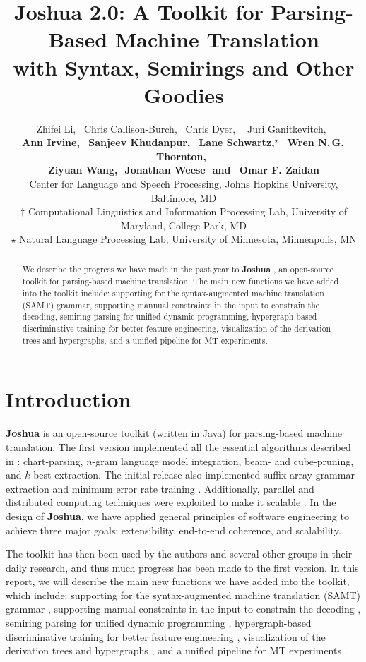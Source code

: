 \documentclass[11pt]{article}
\title{Joshua 2.0: A Toolkit for Parsing-Based Machine Translation \\with Syntax, Semirings and Other Goodies }
\author{
Zhifei Li,\,\,\,
Chris Callison-Burch,\,\,\,
Chris Dyer,$^\dagger$\,\,\,
Juri Ganitkevitch,\,\,\,
\\ {\bf
Ann Irvine,\,\,\,  
Sanjeev Khudanpur,\,\,\,
Lane Schwartz,$^\star$\,\,\, 
Wren N.\,G.\,Thornton,\,\,\,}
\\ {\bf
Ziyuan Wang,\,\,
Jonathan Weese\,\,
{\textnormal{and}}
\,\,\,Omar F. Zaidan
}\\
Center for Language and Speech Processing, Johns Hopkins University, Baltimore, MD\\
$\dagger$ Computational Linguistics and Information Processing Lab, University of Maryland, College Park, MD\\
$\star$ Natural Language Processing Lab, University of Minnesota, Minneapolis, MN }
\date{}
\newcommand{\joshua}{\textbf{Joshua}}
\begin{document}
\maketitle
\begin{abstract}
We describe the progress we have made in the past year to \textbf{Joshua} \cite{joshua-wmt09}, 
an open-source toolkit for parsing-based machine translation.
The main new functions we have added into the toolkit include: supporting for the syntax-augmented machine translation (SAMT) grammar,
supporting mannual constraints in the input to constrain the decoding,  
semiring parsing for unified dynamic programming, hypergraph-based 
discriminative training for better feature engineering, visualization of the derivation
trees and hypergraphs, and a unified pipeline for MT experiments.
\end{abstract}


\listoftodos

\section{Introduction}

\textbf{Joshua} \cite{joshua-wmt09} is an open-source toolkit (written in Java) for parsing-based machine translation.
The first version implemented all the essential algorithms described 
in : chart-parsing, $n$-gram language model integration, beam- and cube-pruning, and $k$-best extraction.  
The initial release also implemented suffix-array grammar extraction \cite{lopez:2007:EMNLP-CoNLL2007} 
and minimum error rate training \cite{och-mert}. 
Additionally, parallel and distributed computing techniques were exploited 
to make it scalable \cite{Joshua-old}. In the design of \joshua, we have applied general
principles of software engineering to achieve three
major goals: extensibility, end-to-end coherence,
and scalability.

The toolkit has then been used by the authors and several
other groups in their daily research, and thus much progress has
been made to the first version. 
In this report, we will describe the main new functions we have added into the 
toolkit, which include: supporting for the syntax-augmented machine translation (SAMT) grammar \cite{samt2006},
supporting manual constraints in the input to constrain the decoding \cite{PBML-2010-Josua-transliteration},  
semiring parsing for unified dynamic programming \cite{li-eisner:2009:EMNLP}, 
hypergraph-based discriminative training for better feature engineering \cite{oracle-extraction-naacl09}, 
visualization of the derivation trees and hypergraphs \cite{PBML-2010-Josua-visualization}, 
and a unified pipeline for MT experiments \cite{Schwartz-wmt10-pipline}.
\end{document}
